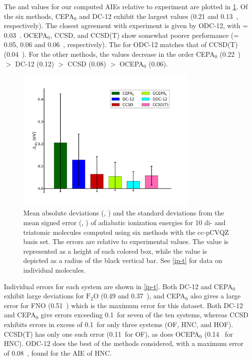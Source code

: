 The \mae and \std values for our computed AIEs relative to experiment are
plotted in \cref{ip-f}.
Of the six methods, CEPA$_0$ and DC-12 exhibit the largest \mae values (0.21 and
0.13~\eV, respectively).
The closest agreement with experiment is given by ODC-12, with \mae = 0.03~\eV.
OCEPA$_0$, CCSD, and CCSD(T) show somewhat poorer performance (\mae = 0.05, 0.06
and 0.06~\eV, respectively). 
The \std for ODC-12 matches that of CCSD(T) (0.04~\eV).
For the other methods, the \std values decrease in the order CEPA$_0$ (0.22~\eV)
$>$ DC-12 (0.12) $>$ CCSD (0.08) $>$ OCEPA$_0$ (0.06).

\begin{figure}
	\centering
	\caption{%
        \label{ip-f}
        Mean absolute deviations (\mae, \eV) and the standard deviations from
        the mean signed error (\std, \eV) of adiabatic ionization energies for
        10 di- and triatomic molecules computed using six methods with the
        cc-pCVQZ basis set.
        The errors are relative to experimental
        values.\cite{Lias:1988p1,Trickl:1989p6006,Zhang:1994p377,Hansel:1998p1748}
        The \mae value is represented as a height of each colored box, while the
        \std value is depicted as a radius of the black vertical bar.
        See \cref{ip-t} for data on individual molecules.
	}
	\includegraphics[width=0.8\textwidth]{figures/ip.pdf}
\end{figure}

Individual errors for each system are shown in \cref{ip-t}.
Both DC-12 and CEPA$_0$ exhibit large deviations for $\mathrm{F_2O}$ (0.49 and
0.37~\eV), and CEPA$_0$ also gives a large error for FNO (0.51~\eV) which is the
maximum error for this dataset.
Both DC-12 and CEPA$_0$ give errors exceeding 0.1~\eV for seven of the ten
systems, whereas CCSD exhibits errors in excess of 0.1~\eV for only three
systems (OF, HNC, and HOF).
CCSD(T) has only one such error (0.11~\eV for OF), as does OCEPA$_0$ (0.14~\eV
for HNC).
ODC-12 does the best of the methods considered, with a maximum error of
0.08~\eV, found for the AIE of HNC.


